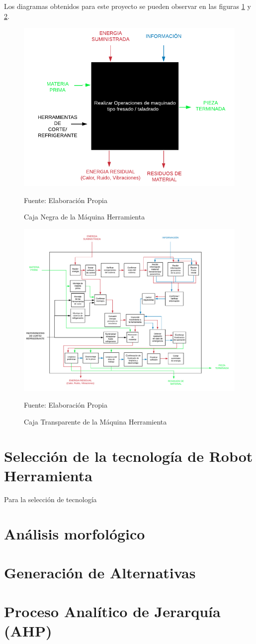 Los diagramas obtenidos para este proyecto se pueden observar en las figuras \ref{fig:CajaNegra} y \ref{fig:CajaTransparente}.

\begin{figure}[htb!]
    \centering
    \includegraphics[width = 0.5 \textwidth]{Cap3_DisenoConceptual/Figura/CajaNegra.pdf}
    \caption{Caja Negra de la Máquina Herramienta}{Fuente: Elaboración Propia}
    \label{fig:CajaNegra}
\end{figure}

\begin{figure}[htb!]
    \centering
    \includegraphics[width= \textwidth]{Cap3_DisenoConceptual/Figura/CajaTransparente.pdf}
    \caption{Caja Transparente de la Máquina Herramienta}{Fuente: Elaboración Propia}
    \label{fig:CajaTransparente}
\end{figure}

\section{Selección de la tecnología de Robot Herramienta}
Para la selección de tecnología  



\section{Análisis morfológico}



\section{Generación de Alternativas}

\section{Proceso Analítico de Jerarquía  (AHP)}